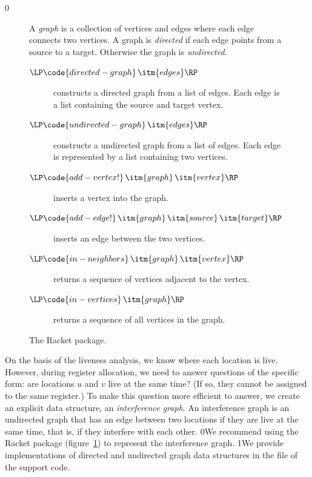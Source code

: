 \documentclass[7x10]{TimesAPriori_MIT}%
\def\racketEd{0}
\def\pythonEd{1}
\def\edition{0}
\newcommand{\racket}[1]{{\if\edition\racketEd{#1}\fi}}
\newcommand{\python}[1]{{\if\edition\pythonEd #1\fi}}
\numberwithin{theorem}{chapter}
\numberwithin{definition}{chapter}
\numberwithin{equation}{chapter}
\begin{document}
{\if\edition\racketEd
\begin{figure}[tp]
  \small
  \begin{tcolorbox}[title=\href{https://docs.racket-lang.org/graph/index.html}{The Racket Graph Library}]
    A \emph{graph} is a collection of vertices and edges where each
    edge connects two vertices.  A graph is \emph{directed} if each
    edge points from a source to a target.  Otherwise the graph is
    \emph{undirected}.
  \begin{description}
  \item[$\LP\code{directed-graph}\,\itm{edges}\RP$] constructs a
    directed graph from a list of edges. Each edge is a list
    containing the source and target vertex.
  \item[$\LP\code{undirected-graph}\,\itm{edges}\RP$] constructs a
    undirected graph from a list of edges. Each edge is represented by
    a list containing two vertices.
  \item[$\LP\code{add-vertex!}\,\itm{graph}\,\itm{vertex}\RP$]
    inserts a vertex into the graph.
  \item[$\LP\code{add-edge!}\,\itm{graph}\,\itm{source}\,\itm{target}\RP$]
    inserts an edge between the two vertices.
  \item[$\LP\code{in-neighbors}\,\itm{graph}\,\itm{vertex}\RP$]
    returns a sequence of vertices adjacent to the vertex.
  \item[$\LP\code{in-vertices}\,\itm{graph}\RP$]
    returns a sequence of all vertices in the graph.
  \end{description}
\end{tcolorbox}
  \caption{The Racket  package.}
  \label{fig:graph}
\end{figure}
\fi}

On the basis of the liveness analysis, we know where each location is
live.  However, during register allocation, we need to answer
questions of the specific form: are locations $u$ and $v$ live at the
same time?  (If so, they cannot be assigned to the same register.)  To
make this question more efficient to answer, we create an explicit
data structure, an \emph{interference
  graph}.  An interference graph is
an undirected graph that has an edge between two locations if they are
live at the same time, that is, if they interfere with each other.
%
\racket{We recommend using the Racket  package
  (figure~\ref{fig:graph}) to represent the interference graph.}
%
\python{We provide implementations of directed and undirected graph
  data structures in the file \code{graph.py} of the support code.}
\end{document}
